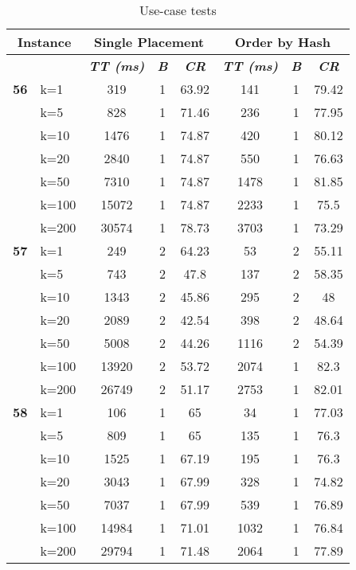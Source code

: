     \begin{table}[htbp]
    \caption{Use-case tests}
    \begin{tabular}{|l|l|c|c|c|c|c|c|}
    
    \multicolumn{ 2}{|c|}{\textbf{Instance}} & \multicolumn{ 3}{c|}{\textbf{Single Placement}} & \multicolumn{ 3}{c|}{\textbf{Order by Hash}} \\ \hline
    \multicolumn{ 2}{|l|}{} & \textbf{\textit{TT (ms)}} & \textbf{\textit{B}} & \textbf{\textit{CR}} & \textbf{\textit{TT (ms)}} & \textbf{\textit{B}} & \textbf{\textit{CR}} \\ \hline
    \multicolumn{1}{|r|}{\textbf{56}} & k=1 & 319 & 1 & 63.92 & 141 & 1 & 79.42 \\ 
     & k=5 & 828 & 1 & 71.46 & 236 & 1 & 77.95 \\ 
     & k=10 & 1476 & 1 & 74.87 & 420 & 1 & 80.12 \\ 
     & k=20 & 2840 & 1 & 74.87 & 550 & 1 & 76.63 \\ 
     & k=50 & 7310 & 1 & 74.87 & 1478 & 1 & 81.85 \\ 
     & k=100 & 15072 & 1 & 74.87 & 2233 & 1 & 75.5 \\ 
     & k=200 & 30574 & 1 & 78.73 & 3703 & 1 & 73.29 \\ \hline
    \multicolumn{1}{|r|}{\textbf{57}} & k=1 & 249 & 2 & 64.23 & 53 & 2 & 55.11 \\ 
     & k=5 & 743 & 2 & 47.8 & 137 & 2 & 58.35 \\ 
     & k=10 & 1343 & 2 & 45.86 & 295 & 2 & 48 \\ 
     & k=20 & 2089 & 2 & 42.54 & 398 & 2 & 48.64 \\ 
     & k=50 & 5008 & 2 & 44.26 & 1116 & 2 & 54.39 \\ 
     & k=100 & 13920 & 2 & 53.72 & 2074 & 1 & 82.3 \\ 
     & k=200 & 26749 & 2 & 51.17 & 2753 & 1 & 82.01 \\ \hline
    \multicolumn{1}{|r|}{\textbf{58}} & k=1 & 106 & 1 & 65 & 34 & 1 & 77.03 \\ 
     & k=5 & 809 & 1 & 65 & 135 & 1 & 76.3 \\ 
     & k=10 & 1525 & 1 & 67.19 & 195 & 1 & 76.3 \\ 
     & k=20 & 3043 & 1 & 67.99 & 328 & 1 & 74.82 \\ 
     & k=50 & 7037 & 1 & 67.99 & 539 & 1 & 76.89 \\ 
     & k=100 & 14984 & 1 & 71.01 & 1032 & 1 & 76.84 \\ 
     & k=200 & 29794 & 1 & 71.48 & 2064 & 1 & 77.89 \\ \hline

\end{tabular}
\end{table}

